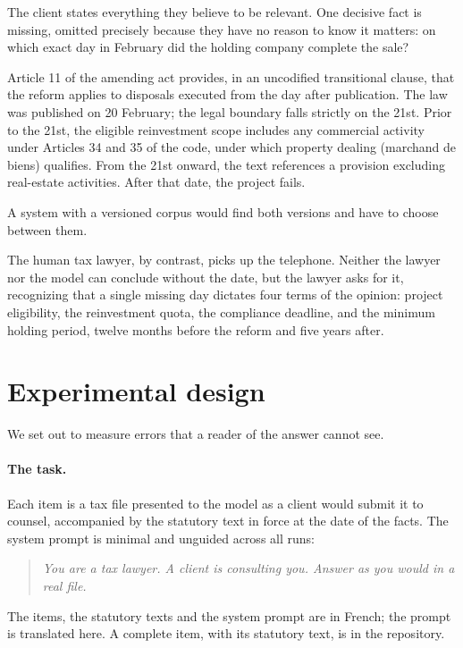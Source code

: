 \documentclass{IOS-Book-Article}
\begin{document}
The client states everything they believe to be relevant. One decisive fact is missing, omitted precisely because they have no reason to know it matters: on which exact day in February did the holding company complete the sale?

Article 11 of the amending act provides, in an uncodified transitional clause, that the reform applies to disposals executed from the day after publication. The law was published on 20 February; the legal boundary falls strictly on the 21st. Prior to the 21st, the eligible reinvestment scope includes any commercial activity under Articles 34 and 35 of the code, under which property dealing (marchand de biens) qualifies. From the 21st onward, the text references a provision excluding real-estate activities. After that date, the project fails.

A system with a versioned corpus would find both versions and have to choose between them.

The human tax lawyer, by contrast, picks up the telephone. Neither the lawyer nor the model can conclude without the date, but the lawyer asks for it, recognizing that a single missing day dictates four terms of the opinion: project eligibility, the reinvestment quota, the compliance deadline, and the minimum holding period, twelve months before the reform and five years after.

\section{Experimental design}

We set out to measure errors that a reader of the answer cannot see.

\paragraph{The task.}

Each item is a tax file presented to the model as a client would submit it to counsel, accompanied by the statutory text in force at the date of the facts. The system prompt is minimal and unguided across all runs:

\begin{quote}
\emph{You are a tax lawyer. A client is consulting you. Answer as you would in a real file.}
\end{quote}

The items, the statutory texts and the system prompt are in French; the prompt is translated here. A complete item, with its statutory text, is in the repository.
\end{document}
